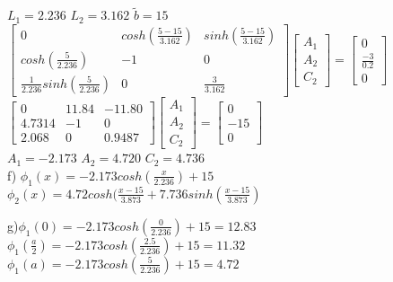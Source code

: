 \documentclass[12pt,fleqn, parskip=full]{scrartcl}
\begin{document}
$L_1 = 2.236$ \quad $L_2 = 3.162$ \quad $\tilde{b} = 15$\\

$\left[
\begin{array}{ccc}
	0 & cosh(\frac{5-15}{3.162})	& sinh(\frac{5-15}{3.162}) \\
	cosh(\frac{5}{2.236}) & -1 & 0 \\
	\frac{1}{2.236}sinh(\frac{5}{2.236}) & 0 & \frac{3}{3.162}
\end{array}
\right]
\left[
\begin{array}{c}
A_1 \\ A_2 \\ C_2
\end{array}
\right] = 
\left[
\begin{array}{c}
0 \\ \frac{-3}{0.2} \\ 0
\end{array}
\right]$\\

$\left[
\begin{array}{ccc}
	0 & 11.84 & -11.80\\
	4.7314 & -1 & 0\\
	2.068 & 0 & 0.9487 
\end{array}
\right]
\left[
\begin{array}{c}
A_1 \\ A_2 \\ C_2
\end{array}
\right] = 
\left[
\begin{array}{c}
0 \\ -15 \\ 0
\end{array}
\right]$\\

$A_1 = -2.173$ \quad $A_2 = 4.720$ \quad $C_2 = 4.736$\\

f) $\phi_1(x) = -2.173cosh(\frac{x}{2.236}) + 15$\\

$\phi_2(x) = 4.72cosh(\frac{x-15}{3.873}+7.736sinh(\frac{x-15}{3.873})$

g)$\phi_1(0) = -2.173cosh(\frac{0}{2.236}) + 15 = 12.83$\\

$\phi_1(\frac{a}{2}) = -2.173cosh(\frac{2.5}{2.236}) + 15 = 11.32$\\

$\phi_1(a) = -2.173cosh(\frac{5}{2.236}) + 15 = 4.72$\\
\end{document}
